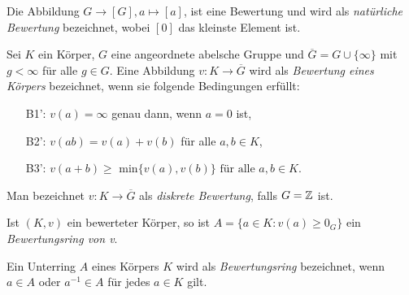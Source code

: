 \begin{bsp}
Die Abbildung $G \to [G], a \mapsto [a]$, ist eine Bewertung und wird als \textit{natürliche Bewertung} bezeichnet, wobei $[0]$ das kleinste Element ist. %
\end{bsp}
%
%
%
%
%
%
%
%
%
%
\begin{defn}  \label{bewKoerper} %
Sei $K$ ein Körper, $G$ eine angeordnete abelsche Gruppe und $\overline{G}  = G \cup \lbrace\infty\rbrace $ mit $g< \infty$ für alle $g \in G$. Eine Abbildung $v\colon K \to \overline{G} $ wird als \textit{Bewertung eines Körpers} bezeichnet, wenn sie folgende Bedingungen erfüllt:
\begin{enumerate}
\item[B1':] $v(a) = \infty$ genau dann, wenn $a = 0$ ist,
\item[B2':] $v(ab) = v\left(a\right)+v\left(b\right) $ für alle $ a, b \in K$,
\item[B3':] $v\left(a+b\right) \ge $ min$\lbrace v(a),v\left(b \right)\rbrace \text{ für alle }  a, b \in K. $
\end{enumerate}
\end{defn}
Man bezeichnet $v\colon K \to \overline{G} $ als \textit{diskrete Bewertung}, falls ${G} = \mathbb{Z}$ ist.
%
%
%
%
%
%
% 
\begin{defn}\label{BewertungsringVonBewertung} %
Ist $\left(K, v\right)$ ein bewerteter Körper, so ist $A = \lbrace  a \in K\colon v(a) \geq 0_G\rbrace$ ein \textit{Bewertungsring von v}.

\end{defn}
%
%
%
%
% 
%
\begin{defn} %
Ein Unterring $A$ eines Körpers $K$ wird als \textit{Bewertungsring} bezeichnet, wenn $a \in A$ oder $a^{-1}\in A$ für jedes $a\in K$ gilt.
\end{defn}
%
%
%
